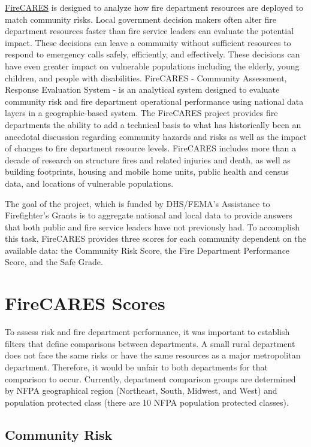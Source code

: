 \documentclass[12pt,oneside]{book}
\begin{document}
\href{https://firecares.org}{FireCARES} is designed to analyze how fire department resources are deployed to match community risks. Local government decision makers often alter fire department resources faster than fire service leaders can evaluate the potential impact. These decisions can leave a community without sufficient resources to respond to emergency calls safely, efficiently, and effectively. These decisions can have even greater impact on vulnerable populations including the elderly, young children, and people with disabilities. FireCARES - Community Assessment, Response Evaluation System - is an analytical system designed to evaluate community risk and fire department operational performance using national data layers in a geographic-based system. The FireCARES project provides fire departments the ability to add a technical basis to what has historically been an anecdotal discussion regarding community hazards and risks as well as the impact of changes to fire department resource levels. FireCARES includes more than a decade of research on structure fires and related injuries and death, as well as building footprints, housing and mobile home units, public health and census data, and locations of vulnerable populations.

The goal of the project, which is funded by DHS/FEMA's Assistance to Firefighter's Grants is to aggregate national and local data to provide answers that both public and fire service leaders have not previously had. To accomplish this task, FireCARES provides three scores for each community dependent on the available data: the Community Risk Score, the Fire Department Performance Score, and the Safe Grade.

\chapter{FireCARES Scores}


To assess risk and fire department performance, it was important to establish filters that define comparisons between departments. A small rural department does not face the same risks or have the same resources as a major metropolitan department. Therefore, it would be unfair to both departments for that comparison to occur. Currently, department comparison groups are determined by NFPA geographical region (Northeast, South, Midwest, and West) and population protected class (there are 10 NFPA population protected classes).

\section{Community Risk}
\end{document}
